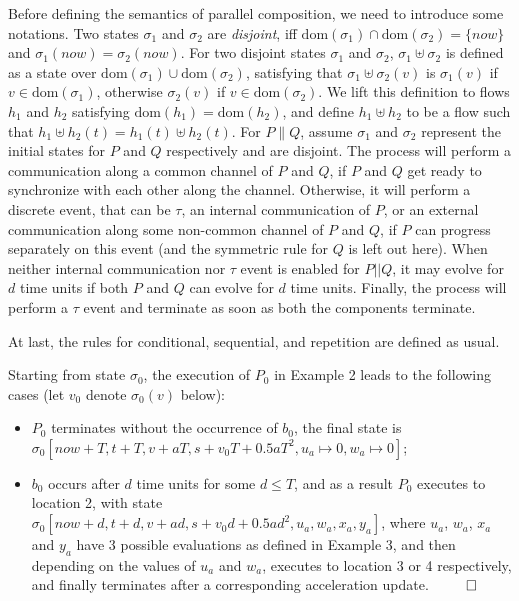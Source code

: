 \documentclass{llncs}
\newcommand{\dom}{\textrm{dom}}
\begin{document}
Before defining the semantics of  parallel composition, we need to introduce some notations.
Two states $\sigma_1$
and $\sigma_2$ are \emph{disjoint}, iff $\dom(\sigma_1) \cap \dom(\sigma_2) = \{now\}$ and $\sigma_1(now) = \sigma_2(now)$. For two disjoint states $\sigma_1$
and $\sigma_2$,  $\sigma_1 \uplus \sigma_2$ is defined as a state over
$\dom(\sigma_1) \cup \dom(\sigma_2) $, satisfying that
$\sigma_1 \uplus \sigma_2(v)$ is $\sigma_1(v)$  if  $v \in \dom(\sigma_1)$, otherwise
$\sigma_2(v)$  if  $v \in \dom(\sigma_2)$.
We lift this definition to flows $h_1$ and $h_2$ satisfying
$\dom(h_1) = \dom(h_2)$, and define $h_1 \uplus h_2$ to be a flow such that
$h_1 \uplus h_2 (t)=h_1(t) \uplus h_2(t)$.
For $P\|Q$, assume $\sigma_1$ and $\sigma_2$   represent the initial states for
$P$ and $Q$ respectively and are disjoint.
The process  will perform a communication along a common channel of $P$ and $Q$, if
$P$ and $Q$ get ready to synchronize with each other along the channel.
Otherwise, it will
perform a discrete event, that can be $\tau$, an internal
communication of $P$, or an external communication along some non-common channel of $P$ and $Q$,
if $P$  can progress separately
on this event (and the symmetric rule for $Q$ is left out here). When
neither internal communication nor $\tau$ event is enabled for $P||Q$, it
may evolve for $d$ time units if both $P$ and $Q$ can evolve for $d$ time units. Finally,
 the process will perform a $\tau$ event and terminate as soon as
both the components terminate.


At last, the rules for conditional, sequential,  and repetition are defined as usual.

\example
Starting from state $\sigma_0$, the execution
of $P_0$ in Example 2 leads to the following cases (let $v_0$ denote $\sigma_0(v)$ below):
\begin{itemize}
\item $P_0$ terminates without the occurrence of $b_0$,
the final state is $\sigma_0[now+T, t +T, v+aT, s+v_0T+0.5 a T^2, u_a \mapsto 0, w_a \mapsto 0]$;
\item $b_0$ occurs after $d$ time units for some $d \leq T$, and as a result $P_0$ executes to location 2, with state $\sigma_0[now+d, t +d, v+ad, s+v_0d+0.5 a d^2, u_a,  w_a, x_a, y_a]$, where  $u_a$, $w_a$, $x_a$ and $y_a$ have 3 possible evaluations as defined in Example 3,  and then depending on the values of $u_a$ and $w_a$, executes to location 3 or 4  respectively, and finally terminates after a corresponding acceleration update. $\ \qed$
\end{itemize}
\end{document}
